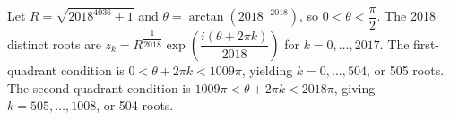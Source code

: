 Let $R=\sqrt{2018^{4036}+1}$ and $\theta=\arctan(2018^{-2018})$, so $0 < \theta < \dfrac{\pi}{2}$. The 2018 distinct roots are $z_k = R^{\dfrac{1}{2018}} \exp (\dfrac{i (\theta+2\pi k)}{2018})$ for $k=0,\ldots,2017$. The first-quadrant condition is $0<\theta+2\pi k<1009\pi$, yielding $k=0,\ldots,504$, or 505 roots. The second-quadrant condition is $1009\pi<\theta+2\pi k<2018\pi$, giving $k=505,\ldots,1008$, or 504 roots.
